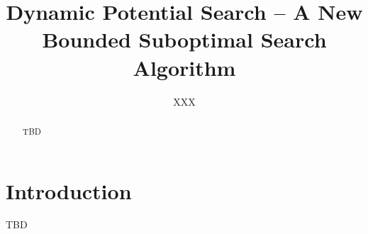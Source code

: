 \documentclass[letterpaper]{article}
\newcommand{\MEMO}[1]
{ \fbox{
\begin{minipage}[b]{7.9 cm}
#1
\end{minipage}
} }
\begin{document}
\title{Dynamic Potential Search -- A New Bounded Suboptimal Search Algorithm}

\author{XXX}

\maketitle

\begin{abstract}%
TBD
\end{abstract}


\section{Introduction}

TBD


\newpage



\end{document}
